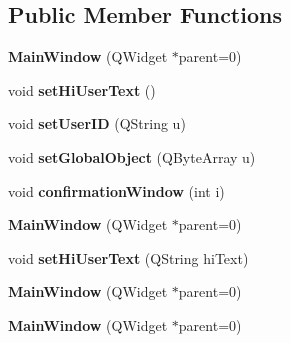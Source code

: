 \subsection*{Public Member Functions}
\begin{DoxyCompactItemize}
\item 
\hypertarget{class_main_window_a8b244be8b7b7db1b08de2a2acb9409db}{{\bfseries Main\-Window} (Q\-Widget $\ast$parent=0)}\label{class_main_window_a8b244be8b7b7db1b08de2a2acb9409db}

\item 
\hypertarget{class_main_window_a05931820affb5e30b4dcc46bdf32e75e}{void {\bfseries set\-Hi\-User\-Text} ()}\label{class_main_window_a05931820affb5e30b4dcc46bdf32e75e}

\item 
\hypertarget{class_main_window_a348aac0acc219ec317294308f6fa618b}{void {\bfseries set\-User\-I\-D} (Q\-String u)}\label{class_main_window_a348aac0acc219ec317294308f6fa618b}

\item 
\hypertarget{class_main_window_a2436f8c6685172068604c43c25709040}{void {\bfseries set\-Global\-Object} (Q\-Byte\-Array u)}\label{class_main_window_a2436f8c6685172068604c43c25709040}

\item 
\hypertarget{class_main_window_a1ac1c3e1eb71f7b08800559898e7bac5}{void {\bfseries confirmation\-Window} (int i)}\label{class_main_window_a1ac1c3e1eb71f7b08800559898e7bac5}

\item 
\hypertarget{class_main_window_a8b244be8b7b7db1b08de2a2acb9409db}{{\bfseries Main\-Window} (Q\-Widget $\ast$parent=0)}\label{class_main_window_a8b244be8b7b7db1b08de2a2acb9409db}

\item 
\hypertarget{class_main_window_ab1d0cc488a9fcaa215e13413e05d20a3}{void {\bfseries set\-Hi\-User\-Text} (Q\-String hi\-Text)}\label{class_main_window_ab1d0cc488a9fcaa215e13413e05d20a3}

\item 
\hypertarget{class_main_window_a8b244be8b7b7db1b08de2a2acb9409db}{{\bfseries Main\-Window} (Q\-Widget $\ast$parent=0)}\label{class_main_window_a8b244be8b7b7db1b08de2a2acb9409db}

\item 
\hypertarget{class_main_window_a8b244be8b7b7db1b08de2a2acb9409db}{{\bfseries Main\-Window} (Q\-Widget $\ast$parent=0)}\label{class_main_window_a8b244be8b7b7db1b08de2a2acb9409db}


\end{DoxyCompactItemize}
